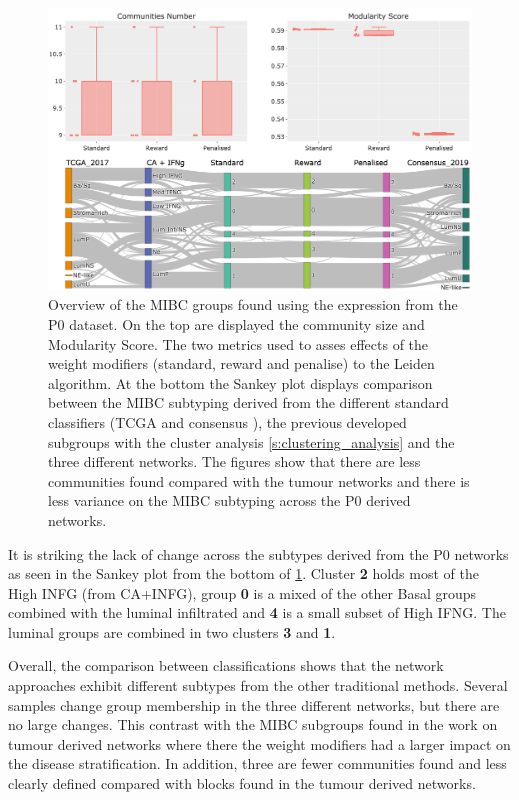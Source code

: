 \begin{figure}[!t]    
    \centering
    \includegraphics[width=1.0\textwidth,keepaspectratio]{Sections/Network_I/Resources/P0/Ldn_Sky_TF_50_RawKMeans_K5_v3.png}
    \caption{Overview of the MIBC groups found using the expression from the P0 dataset. On the top are displayed the community size and Modularity Score. The two metrics used to asses effects of the weight modifiers (standard, reward and penalise) to the Leiden algorithm. At the bottom the Sankey plot displays comparison between the MIBC subtyping derived from the different standard classifiers (TCGA \citep{Robertson2017-mg} and consensus \citep{Kamoun2020-tj}), the previous developed subgroups with the cluster analysis \cref{s:clustering_analysis} and the three different networks. The figures show that there are less communities found compared with the tumour networks and there is less variance on the MIBC subtyping across the P0 derived networks. }
    \label{fig:N_I:p0_sky_leiden}
\end{figure}

It is striking the lack of change across the subtypes derived from the P0 networks as seen in the Sankey plot from the bottom of \cref{fig:N_I:p0_sky_leiden}. Cluster \textbf{2} holds most of the High INFG (from CA+INFG), group \textbf{0} is a mixed of the other Basal groups combined with the luminal infiltrated and \textbf{4} is a small subset of High IFNG. The luminal groups are combined in two clusters \textbf{3} and \textbf{1}.

Overall, the comparison between classifications shows that the network approaches exhibit different subtypes from the other traditional methods.  Several samples change group membership in the three different networks, but there are no large changes. This contrast with the MIBC subgroups found in the work on tumour derived networks where there the weight modifiers had a larger impact on the disease stratification. In addition,  three are fewer communities found and less clearly defined compared with blocks found in the tumour derived networks. 


